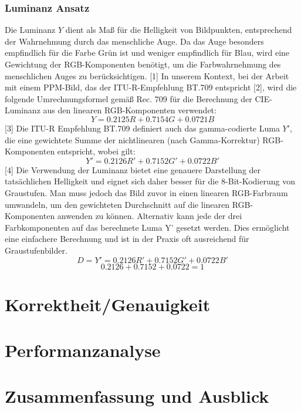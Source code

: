 \documentclass[course=erap]{aspdoc}
\begin{document}
\subsubsection{Luminanz Ansatz}
Die Luminanz $Y$ dient als Maß für die Helligkeit von Bildpunkten, entsprechend der Wahrnehmung durch das menschliche Auge. Da das Auge besonders empfindlich für die Farbe Grün ist und weniger empfindlich für Blau, wird eine Gewichtung der RGB-Komponenten benötigt, um die Farbwahrnehmung des menschlichen Auges zu berücksichtigen. [1]
In unserem Kontext, bei der Arbeit mit einem PPM-Bild, das der ITU-R-Empfehlung BT.709 entspricht [2], wird die folgende Umrechnungsformel gemäß Rec. 709 für die Berechnung der CIE-Luminanz aus den linearen RGB-Komponenten verwendet:
 \[Y = 0.2125R + 0.7154G + 0.0721B \] [3]
Die ITU-R Empfehlung BT.709 definiert auch das gamma-codierte Luma $Y'$, die eine gewichtete Summe der nichtlinearen (nach Gamma-Korrektur) RGB-Komponenten entspricht, wobei gilt:
 \[Y' = 0.2126R' + 0.7152G' + 0.0722B' \] [4]
Die Verwendung der Luminanz bietet eine genauere Darstellung der tatsächlichen Helligkeit und eignet sich daher besser für die 8-Bit-Kodierung von Graustufen. Man muss jedoch das Bild zuvor in einen linearen RGB-Farbraum umwandeln, um den gewichteten Durchschnitt auf die linearen RGB-Komponenten anwenden zu können.
Alternativ kann jede der drei Farbkomponenten auf das berechnete Luma Y' gesetzt werden. Dies ermöglicht eine einfachere Berechnung und ist in der Praxis oft ausreichend für Graustufenbilder.
 \[ D = Y' = 0.2126R' + 0.7152G' + 0.0722B' \]    \[0.2126 + 0.7152 + 0.0722 = 1\]




\section{Korrektheit/Genauigkeit}


\section{Performanzanalyse}


\section{Zusammenfassung und Ausblick}


{}
\end{document}
